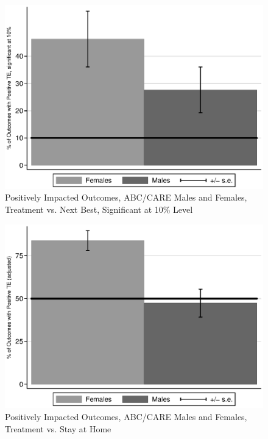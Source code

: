 \begin{frame}[plain]
	\begin{center}
\begin{figure}[H] 
\caption{Positively Impacted Outcomes, ABC/CARE Males and Females, Treatment vs. Next Best, Significant at 10\% Level}
\label{figure:youlabel}
\centering
\includegraphics[width=.9\columnwidth]{output/itt_noctrl_all_sig10.eps}
\end{figure}
\end{center}
\end{frame}

\begin{frame}[plain]
	\begin{center}
\begin{figure}[H] 
\caption{Positively Impacted Outcomes, ABC/CARE Males and Females,  Treatment vs. Stay at Home}
\label{figure:youlabel}
\centering
\includegraphics[width=.9\columnwidth]{output/epan_ipw_p0_all.eps}
\end{figure}
\end{center}
\end{frame}

